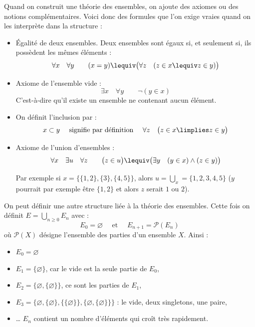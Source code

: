 \documentclass[11pt,class=report,crop=false]{standalone}
\begin{document}
\bigskip

Quand on construit une théorie des ensembles, on ajoute des axiomes ou des notions complémentaires. Voici donc des formules que l'on exige vraies quand on les interprète dans la structure :
\begin{itemize}
	\item Égalité de deux ensembles.
	Deux ensembles sont égaux si, et seulement si, ils possèdent les mêmes éléments :
	\[
	\forall x \quad \forall y \qquad 
	(x=y) \lequiv \big( \forall z \quad (  z \in x \lequiv z \in y )\big)
	\]
	
	\item Axiome de l'ensemble vide :
	\[
	\exists x \quad \forall y \qquad \lnot (y \in x)
	\]
	C'est-à-dire qu'il existe un ensemble ne contenant aucun élément.
	
	\item On définit l'inclusion par :
	\[
	x \subset y \quad \text{ signifie par définition } \quad \forall z \quad \big( z \in x \limplies z \in y \big)
	\]
	
	\item Axiome de l'union d'ensembles :
	\[
	\forall x \quad \exists u \quad \forall z \qquad
	\big( z \in u \big) \lequiv  \big( \exists y \quad (y \in x) \land (z \in y) \big)
	\]
	
	Par exemple si $x = \big\{ \{1,2\}, \{3\}, \{4,5\} \big\}$, alors $u = \bigcup_x = \{1,2,3,4,5\}$ ($y$ pourrait par exemple être $\{1,2\}$ et alors $z$ serait $1$ ou $2$).
\end{itemize}


\bigskip

On peut définir une autre structure liée à la théorie des ensembles.
Cette fois on définit $E = \bigcup_{n\ge0} E_n$ avec :
\[
E_0 = \varnothing \quad \text{ et } \quad E_{n+1} = \mathcal{P}(E_n)
\]
où $\mathcal{P}(X)$ désigne l'ensemble des parties d'un ensemble $X$.
Ainsi :
\begin{itemize}
	\item $E_0 = \varnothing$
	
	\item $E_1 =\big \{ \varnothing \big\}$, car le vide est la seule partie de $E_0$,
	
	\item $E_2 = \big\{ \varnothing, \{ \varnothing \} \big\}$, ce sont les parties de $E_1$,
	
	\item $E_3 = \big\{ \varnothing, \{ \varnothing \}, \{\{ \varnothing \}\}, \{ \varnothing, \{ \varnothing \}\} \big\}$ : le vide, deux singletons, une paire,
	
	\item \ldots{} $E_n$ contient un nombre d'éléments qui croît très rapidement.
\end{itemize}
\end{document}
